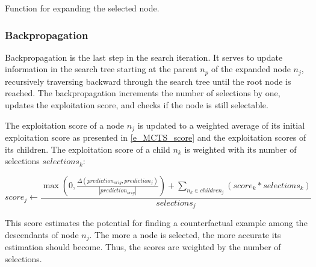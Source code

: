{
\setlength{\algomargin}{1.25em}
\begin{algorithm}[ht]
\caption{Function for expanding the selected node.}
\small
\label{a_MCTS_Expand}
\end{algorithm}
}

\subsubsection{Backpropagation}
\label{s_Methodology_Search_Backpropagation}

Backpropagation is the last step in the search iteration. It serves to update information in the search tree starting at the parent $n_p$ of the expanded node $n_j$, recursively traversing backward through the search tree until the root node is reached. The backpropagation increments the number of selections by one, updates the exploitation score, and checks if the node is still selectable.

The exploitation score of a node $n_j$ is updated to a weighted average of its initial exploitation score as presented in \ref{e_MCTS_score} and the exploitation scores of its children. The exploitation score of a child $n_k$ is weighted with its number of selections $selections_k$:

\begin{equation}
    score_j \gets \frac{
        \max\left(0, \frac{\Delta(prediction_{orig}, prediction_j)}{|prediction_{orig}|}\right) + \sum_{n_k \in children_j} (score_k * selections_k)
    }{
        selections_j
    }
\end{equation}

This score estimates the potential for finding a counterfactual example among the descendants of node $n_j$. The more a node is selected, the more accurate its estimation should become. Thus, the scores are weighted by the number of selections. 

